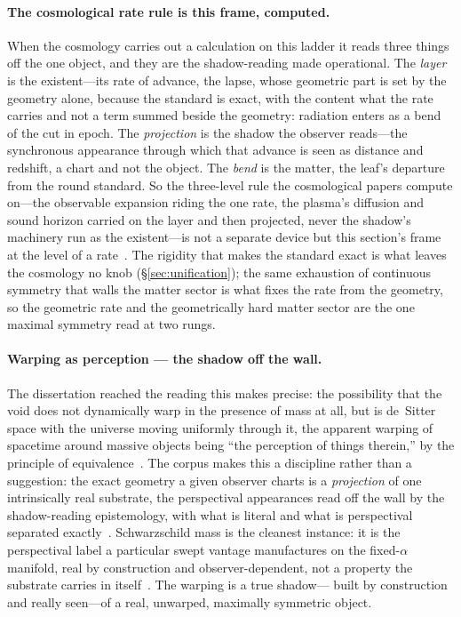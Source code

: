 \documentclass[11pt,a4paper]{article}
\theoremstyle{definition}
\begin{document}
\paragraph{The cosmological rate rule is this frame, computed.} When the
cosmology carries out a calculation on this ladder it reads three things off
the one object, and they are the shadow-reading made operational. The
\emph{layer} is the existent---its rate of advance, the lapse, whose
geometric part is set by the geometry alone, because the standard
is exact, with the content what the rate carries and not a term summed
beside the geometry: radiation enters as a bend of the cut in epoch. The \emph{projection} is the shadow the observer reads---the
synchronous appearance through which that advance is seen as distance and
redshift, a chart and not the object. The \emph{bend} is the matter, the
leaf's departure from the round standard. So the three-level rule the
cosmological papers compute on---the observable expansion riding the
one rate, the plasma's diffusion and sound horizon carried on the
layer and then projected, never the shadow's machinery run as the
existent---is not a separate device but this section's frame at the level of
a rate~\cite{JanzenModernParallax,JanzenCanonicalTime,JanzenCRcosmology,JanzenCosmogenesis}.
The rigidity that makes the standard exact is what leaves the cosmology no
knob (\S\ref{sec:unification}); the same exhaustion of continuous symmetry
that walls the matter sector is what fixes the rate from the geometry, so the
geometric rate and the geometrically hard matter sector are the one
maximal symmetry read at two rungs.

\paragraph{Warping as perception --- the shadow off the wall.} The
dissertation reached the reading this makes precise: the possibility that
the void does not dynamically warp in the presence of mass at all, but is
de~Sitter space with the universe moving uniformly through it, the apparent
warping of spacetime around massive objects being ``the perception of things
therein,'' by the principle of equivalence~\cite{JanzenThesis}. The corpus
makes this a discipline rather than a suggestion: the exact
geometry a given observer charts is a \emph{projection} of one intrinsically
real substrate, the perspectival appearances read off the wall by the
shadow-reading epistemology, with what is literal and what is perspectival
separated exactly~\cite{JanzenShadowExistence,JanzenCRframework}. Schwarzschild mass is
the cleanest instance: it is the perspectival label a particular swept
vantage manufactures on the fixed-$\alpha$ manifold, real by construction and
observer-dependent, not a property the substrate carries in
itself~\cite{JanzenSlicing,JanzenGroupoid}. The warping is a true shadow---%
built by construction and really seen---of a real, unwarped, maximally
symmetric object.
\end{document}
